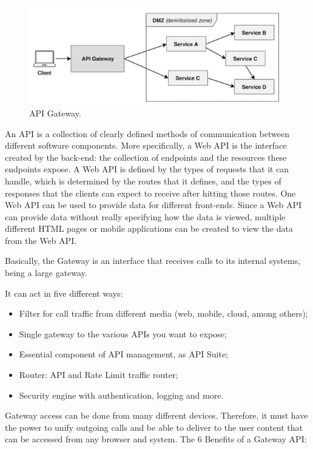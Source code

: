 \begin{figure}[htbp]
\begin{center}
  \includegraphics[scale=0.75]{images/apigateway.png}
\caption{API Gateway.}
\label{default-regular2}
\end{center}
\end{figure}

An API is a collection of clearly defined methods of communication between different software components. More specifically, a Web API is the interface created by the back-end: the collection of endpoints and the resources these endpoints expose. A Web API is defined by the types of requests that it can handle, which is determined by the routes that it defines, and the types of responses that the clients can expect to receive after hitting those routes. One Web API can be used to provide data for different front-ends. Since a Web API can provide data without really specifying how the data is viewed, multiple different HTML pages or mobile applications can be created to view the data from the Web API.

Basically, the Gateway is an interface that receives calls to its internal systems, being a large gateway. 

It can act in five different ways:

\begin{itemize}
\item Filter for call traffic from different media (web, mobile, cloud, among others);
\item Single gateway to the various APIs you want to expose;
\item Essential component of API management, as API Suite;
\item Router: API and Rate Limit traffic router;
\item Security engine with authentication, logging and more.
\end{itemize}

Gateway access can be done from many different devices. Therefore, it must have the power to unify outgoing calls and be able to deliver to the user content that can be accessed from any browser and system. The 6 Benefits of a Gateway API:

